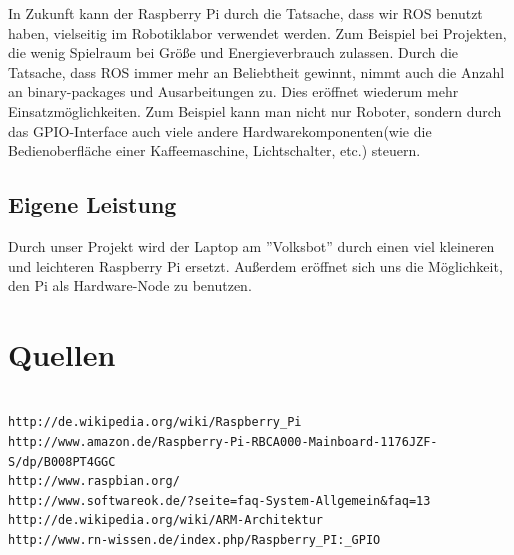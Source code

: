 \documentclass[12pt]{article}
\begin{document}
In Zukunft kann der Raspberry Pi durch die Tatsache, dass wir ROS benutzt haben, vielseitig im Robotiklabor verwendet werden. Zum Beispiel bei Projekten, die wenig Spielraum bei Größe und Energieverbrauch zulassen.
Durch die Tatsache, dass ROS immer mehr an Beliebtheit gewinnt, nimmt auch die Anzahl an binary-packages und Ausarbeitungen zu. Dies eröffnet wiederum mehr Einsatzmöglichkeiten.
Zum Beispiel kann man nicht nur Roboter, sondern durch das GPIO-Interface auch viele andere Hardwarekomponenten(wie die Bedienoberfläche einer Kaffeemaschine, Lichtschalter, etc.) steuern.  


\subsection{Eigene Leistung}

Durch unser Projekt wird der Laptop am ''Volksbot'' durch einen viel kleineren und leichteren Raspberry Pi ersetzt. Außerdem eröffnet sich uns die Möglichkeit, den Pi als Hardware-Node zu benutzen.

\section{Quellen}
\begin{verbatim}

http://de.wikipedia.org/wiki/Raspberry_Pi
http://www.amazon.de/Raspberry-Pi-RBCA000-Mainboard-1176JZF-S/dp/B008PT4GGC
http://www.raspbian.org/
http://www.softwareok.de/?seite=faq-System-Allgemein&faq=13
http://de.wikipedia.org/wiki/ARM-Architektur
http://www.rn-wissen.de/index.php/Raspberry_PI:_GPIO

\end{verbatim}
\end{document}
